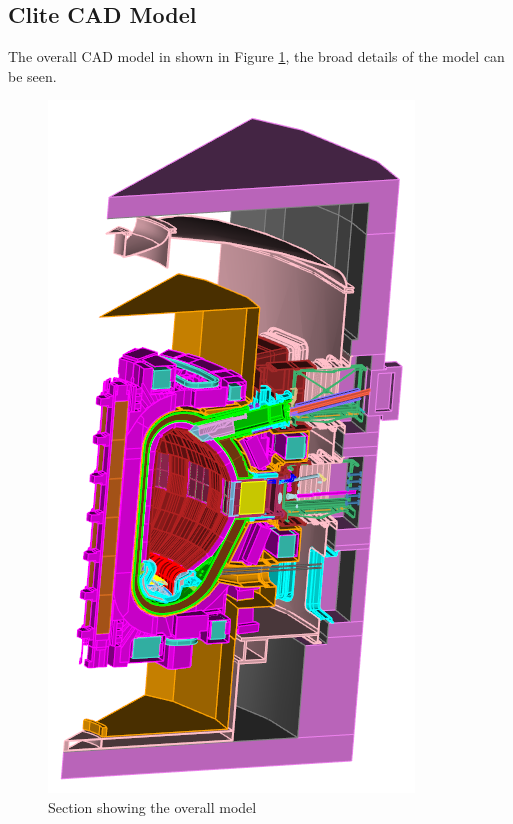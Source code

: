 \documentclass[12pt]{article}
\begin{document}
\subsection{Clite CAD Model}
The overall CAD model in shown in Figure \ref{fig:cad_iter_global}, the broad details of the model can be seen. 
\begin{figure}[ht!]
  \centering
  \includegraphics[scale=0.8]{../plots/cad/global.png}
  \caption{Section showing the overall model}
  \label{fig:cad_iter_global}
\end{figure}
\end{document}
